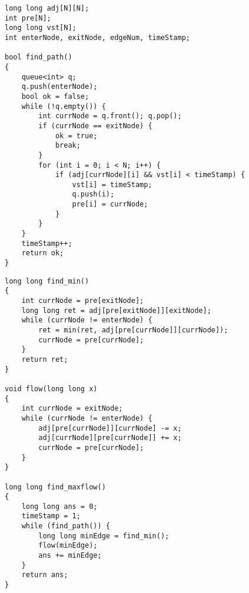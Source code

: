 \documentclass{article}
\begin{document}
\begin{multicols}{2}
\begin{lstlisting}
long long adj[N][N];
int pre[N];
long long vst[N];
int enterNode, exitNode, edgeNum, timeStamp;

bool find_path()
{
	queue<int> q;
	q.push(enterNode);
	bool ok = false;
	while (!q.empty()) {
		int currNode = q.front(); q.pop();
		if (currNode == exitNode) {
			ok = true;
			break;
		}
		for (int i = 0; i < N; i++) {
			if (adj[currNode][i] && vst[i] < timeStamp) {
				vst[i] = timeStamp;
				q.push(i);
				pre[i] = currNode;
			}
		}
	}
	timeStamp++;
	return ok;
}
\end{lstlisting}
\columnbreak
\begin{lstlisting}
long long find_min()
{
	int currNode = pre[exitNode];
	long long ret = adj[pre[exitNode]][exitNode];
	while (currNode != enterNode) {
		ret = min(ret, adj[pre[currNode]][currNode]);
		currNode = pre[currNode];
	}
	return ret;
}

void flow(long long x)
{
	int currNode = exitNode;
	while (currNode != enterNode) {
		adj[pre[currNode]][currNode] -= x;
		adj[currNode][pre[currNode]] += x;
		currNode = pre[currNode];
	}
}

long long find_maxflow()
{
	long long ans = 0;
	timeStamp = 1;
	while (find_path()) {
		long long minEdge = find_min();
		flow(minEdge);
		ans += minEdge;
	}
	return ans;
}
\end{lstlisting}
\end{multicols}
 
\end{document}
